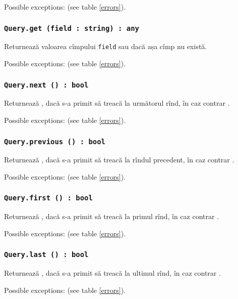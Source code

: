 Possible exceptions:  (see table \ref{errors}).

\subsubsection{\texttt{Query.get (field : string) : any}}

Returnează valoarea cîmpului \texttt{field} sau \void{} dacă așa cîmp nu există.

Possible exceptions:  (see table \ref{errors}).

\subsubsection{\texttt{Query.next () : bool}}

Returnează \true, dacă s-a primit să treacă la următorul rînd, în caz contrar \false.

Possible exceptions:  (see table \ref{errors}).

\subsubsection{\texttt{Query.previous () : bool}}

Returnează \true, dacă s-a primit să treacă la rîndul precedent, în caz contrar \false.

Possible exceptions:  (see table \ref{errors}).

\subsubsection{\texttt{Query.first () : bool}}

Returnează \true, dacă s-a primit să treacă la primul rînd, în caz contrar \false.

Possible exceptions:  (see table \ref{errors}).

\subsubsection{\texttt{Query.last () : bool}}

Returnează \true, dacă s-a primit să treacă la ultimul rînd, în caz contrar \false.

Possible exceptions:  (see table \ref{errors}).

